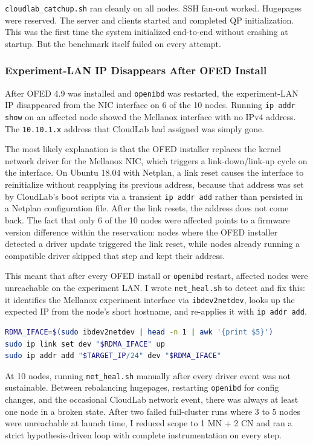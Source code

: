 \documentclass[10pt]{article}
\begin{document}
\texttt{cloudlab\_catchup.sh} ran cleanly on all nodes.
SSH fan-out worked.
Hugepages were reserved.
The server and clients started and completed QP initialization.
This was the first time the system initialized end-to-end without crashing at startup.
But the benchmark itself failed on every attempt.

\subsubsection{Experiment-LAN IP Disappears After OFED Install}

After OFED 4.9 was installed and \texttt{openibd} was restarted,
the experiment-LAN IP disappeared from the NIC interface on 6 of the 10 nodes.
Running \texttt{ip addr show} on an affected node showed the Mellanox interface
with no IPv4 address.
The \texttt{10.10.1.x} address that CloudLab had assigned was simply gone.

The most likely explanation is that the OFED installer replaces the kernel network
driver for the Mellanox NIC, which triggers a link-down/link-up cycle on the
interface.
On Ubuntu 18.04 with Netplan, a link reset causes the interface to reinitialize
without reapplying its previous address, because that address was set by
CloudLab's boot scripts via a transient \texttt{ip addr add} rather than
persisted in a Netplan configuration file.
After the link resets, the address does not come back.
The fact that only 6 of the 10 nodes were affected points to a firmware version
difference within the reservation: nodes where the OFED installer detected a
driver update triggered the link reset, while nodes already running a compatible
driver skipped that step and kept their address.

This meant that after every OFED install or \texttt{openibd} restart,
affected nodes were unreachable on the experiment LAN.
I wrote \texttt{net\_heal.sh} to detect and fix this: it identifies the Mellanox
experiment interface via \texttt{ibdev2netdev}, looks up the expected IP from the
node's short hostname, and re-applies it with \texttt{ip addr add}.

\begin{lstlisting}[language=bash]
RDMA_IFACE=$(sudo ibdev2netdev | head -n 1 | awk '{print $5}')
sudo ip link set dev "$RDMA_IFACE" up
sudo ip addr add "$TARGET_IP/24" dev "$RDMA_IFACE"
\end{lstlisting}

At 10 nodes, running \texttt{net\_heal.sh} manually after every driver event
was not sustainable.
Between rebalancing hugepages, restarting \texttt{openibd} for config changes,
and the occasional CloudLab network event, there was always at least one node in
a broken state.
After two failed full-cluster runs where 3 to 5 nodes were unreachable at
launch time, I reduced scope to 1 MN + 2 CN and ran a strict hypothesis-driven
loop with complete instrumentation on every step.
\end{document}
